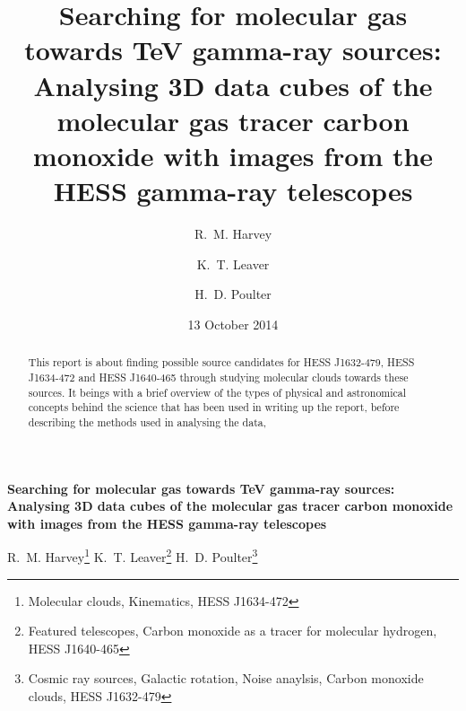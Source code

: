 \documentclass[a4paper, titlepage, oneside]{article}
\begin{document}
\title{\textbf{Searching for molecular gas towards TeV gamma-ray sources: Analysing 3D data cubes of the molecular gas tracer carbon monoxide with images from the HESS gamma-ray telescopes}}
\author{R.~M. Harvey \and K.~T. Leaver \and H.~D. Poulter}
\date{13 October 2014} %
\maketitle

\setcounter{page}{1}

\tableofcontents

\clearpage
\setcounter{page}{1}

\begin{center}
  {\large \textbf{Searching for molecular gas towards TeV gamma-ray sources: Analysing 3D data cubes of the molecular gas tracer carbon monoxide with images from the HESS gamma-ray telescopes}}

  \vspace{1.5em}

  R.~M. Harvey\footnote{Molecular clouds, Kinematics, HESS J1634-472} \quad K.~T. Leaver\footnote{Featured telescopes, Carbon monoxide as a tracer for molecular hydrogen, HESS J1640-465} \quad H.~D. Poulter\footnote{Cosmic ray sources, Galactic rotation, Noise anaylsis, Carbon monoxide clouds, HESS J1632-479}
\end{center}

\vspace{1.5em}

\begin{minipage}{0.93\textwidth}
  \begin{abstract} %
  This report is about finding possible source candidates for HESS J1632-479, HESS J1634-472 and HESS J1640-465 through studying molecular clouds towards these sources. It beings with a brief overview of the types of physical and astronomical concepts behind the science that has been used in writing up the report, before describing the methods used in analysing the data,
  \end{abstract}
\end{minipage}

\vspace{1em}
\end{document}
